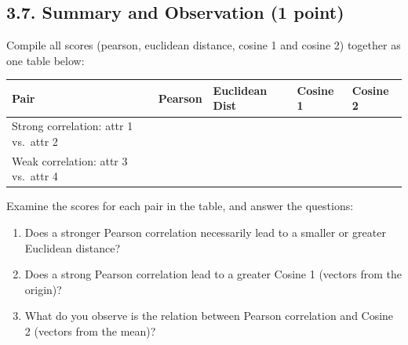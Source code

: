 \documentclass[
  letterpaper,
]{scrbook}
\newcounter{none} %
\providecommand{\tightlist}{%
  \setlength{\itemsep}{0pt}\setlength{\parskip}{0pt}}
\begin{document}
\subsection*{3.7. Summary and Observation (1
point)}\label{summary-and-observation-1-point}

Compile all scores (pearson, euclidean distance, cosine 1 and cosine 2)
together as one table below:

{\def\LTcaptype{none} %
\begin{longtable}[]{@{}
  >{\raggedright\arraybackslash}p{}
  >{\raggedright\arraybackslash}p{}
  >{\raggedright\arraybackslash}p{}
  >{\raggedright\arraybackslash}p{}
  >{\raggedright\arraybackslash}p{}@{}}
\toprule\noalign{}
\begin{minipage}[b]{\linewidth}\raggedright
Pair
\end{minipage} & \begin{minipage}[b]{\linewidth}\raggedright
Pearson
\end{minipage} & \begin{minipage}[b]{\linewidth}\raggedright
Euclidean Dist
\end{minipage} & \begin{minipage}[b]{\linewidth}\raggedright
Cosine 1
\end{minipage} & \begin{minipage}[b]{\linewidth}\raggedright
Cosine 2
\end{minipage} \\
\midrule\noalign{}
\endhead
\bottomrule\noalign{}
\endlastfoot
Strong correlation: attr 1 vs.~attr 2 & & & & \\
Weak correlation: attr 3 vs.~attr 4 & & & & \\
\end{longtable}
}

Examine the scores for each pair in the table, and answer the questions:

\begin{enumerate}
\def\labelenumi{\arabic{enumi}.}
\tightlist
\item
  Does a stronger Pearson correlation necessarily lead to a smaller or
  greater Euclidean distance?
\item
  Does a strong Pearson correlation lead to a greater Cosine 1 (vectors
  from the origin)?
\item
  What do you observe is the relation between Pearson correlation and
  Cosine 2 (vectors from the mean)?
\end{enumerate}
\end{document}
